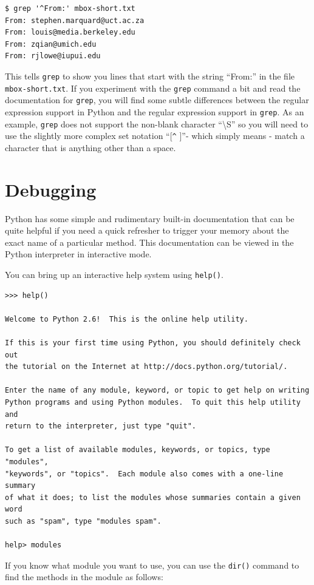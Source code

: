 \documentclass[11pt]{book}
\begin{document}
\beforeverb
\begin{verbatim}
$ grep '^From:' mbox-short.txt
From: stephen.marquard@uct.ac.za
From: louis@media.berkeley.edu
From: zqian@umich.edu
From: rjlowe@iupui.edu
\end{verbatim}
\afterverb
%
This tells {\tt grep} to show you lines that start with the string ``From:'' in the file {\tt mbox-short.txt}.   If you experiment with the {\tt grep} command a bit and read the documentation for {\tt grep}, you will find some subtle differences between the regular expression support in Python and the regular expression support in {\tt grep}.  As an example, {\tt grep} does not support the non-blank character ``{\textbackslash}S'' so you will need to use the slightly more complex set notation ``[\verb"^" ]''- which simply means - match a character that is anything other than a space.

\section{Debugging}

Python has some simple and rudimentary built-in documentation that can be quite helpful if you need a quick refresher to trigger your memory about the exact name of a particular method.   This documentation can be viewed in the Python interpreter in interactive mode.

You can bring up an interactive help system using {\tt help()}.

\beforeverb
\begin{verbatim}
>>> help()

Welcome to Python 2.6!  This is the online help utility.

If this is your first time using Python, you should definitely check out
the tutorial on the Internet at http://docs.python.org/tutorial/.

Enter the name of any module, keyword, or topic to get help on writing
Python programs and using Python modules.  To quit this help utility and
return to the interpreter, just type "quit".

To get a list of available modules, keywords, or topics, type "modules",
"keywords", or "topics".  Each module also comes with a one-line summary
of what it does; to list the modules whose summaries contain a given word
such as "spam", type "modules spam".

help> modules
\end{verbatim}
\afterverb
%
If you know what module you want to use, you can use the {\tt dir()} command to find the methods in the module as follows:
\end{document}
